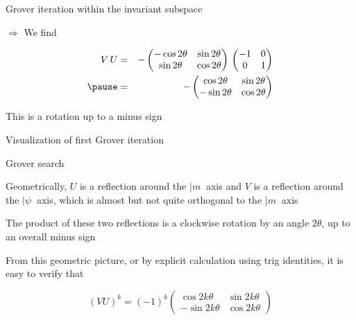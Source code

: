 \begin{frame}{Grover iteration within the invariant subspace}

$\Rightarrow$ We find

\begin{eqnarray*}
V \, U 
& = &
-
\begin{pmatrix} 
  -\cos 2\theta & \sin 2\theta \\
   \sin 2\theta & \cos 2 \theta 
\end{pmatrix} 
\,
\begin{pmatrix} -1 & 0 \\ 0 & 1 \end{pmatrix} \\ \pause
& = &
- 
\begin{pmatrix}  
	  \cos 2\theta & \sin 2\theta \\
  - \sin 2\theta & \cos 2\theta
\end{pmatrix}
\end{eqnarray*}

\bigskip
This is a rotation up to a minus sign
\end{frame}




\begin{frame}{Visualization of first Grover iteration}

\begin{center}
\end{center}
\end{frame}




\begin{frame}{Grover search}

Geometrically, $U$ is a reflection around the $|m\>$ axis and $V$ is a reflection around the $|\psi\>$ axis, 
which is almost but not quite orthogonal to the $|m\>$ axis

\bigskip
The product of these two reflections is a clockwise rotation by an angle $2\theta$, up to an overall minus sign

\bigskip
From this geometric picture, or by explicit calculation using trig identities, it is easy to verify that

\bigskip
\[
  (VU)^k = (-1)^k \begin{pmatrix} \cos2k\theta & \sin2k\theta \\
                       - \sin2k\theta & \cos2k\theta\end{pmatrix}
\]

\end{frame}

